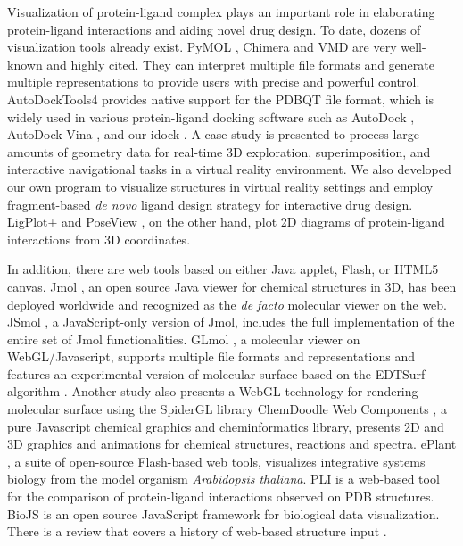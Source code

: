 \documentclass{bioinfo}
\begin{document}
Visualization of protein-ligand complex plays an important role in elaborating protein-ligand interactions and aiding novel drug design. To date, dozens of visualization tools already exist. PyMOL \citep{1221}, Chimera \citep{1219} and VMD \citep{1220} are very well-known and highly cited. They can interpret multiple file formats and generate multiple representations to provide users with precise and powerful control. AutoDockTools4 \citep{596} provides native support for the PDBQT file format, which is widely used in various protein-ligand docking software such as AutoDock \citep{596}, AutoDock Vina \citep{595}, and our idock \citep{1153}. A case study \citep{1321} is presented to process large amounts of geometry data for real-time 3D exploration, superimposition, and interactive navigational tasks in a virtual reality environment. We also developed our own program \citep{1265} to visualize structures in virtual reality settings and employ fragment-based \textit{de novo} ligand design strategy for interactive drug design. LigPlot+ \citep{951} and PoseView \citep{748}, on the other hand, plot 2D diagrams of protein-ligand interactions from 3D coordinates.

In addition, there are web tools based on either Java applet, Flash, or HTML5 canvas. Jmol \citep{1263}, an open source Java viewer for chemical structures in 3D, has been deployed worldwide and recognized as the \textit{de facto} molecular viewer on the web. JSmol \citep{1314}, a JavaScript-only version of Jmol, includes the full implementation of the entire set of Jmol functionalities. GLmol \citep{1319}, a molecular viewer on WebGL/Javascript, supports multiple file formats and representations and features an experimental version of molecular surface based on the EDTSurf algorithm \citep{1297}. Another study \citep{1262} also presents a WebGL technology for rendering molecular surface using the SpiderGL library \citep{1320} ChemDoodle Web Components \citep{1264}, a pure Javascript chemical graphics and cheminformatics library, presents 2D and 3D graphics and animations for chemical structures, reactions and spectra. ePlant \citep{1242}, a suite of open-source Flash-based web tools, visualizes integrative systems biology from the model organism \textit{Arabidopsis thaliana}. PLI \citep{1288} is a web-based tool for the comparison of protein-ligand interactions observed on PDB structures. BioJS \citep{1308} is an open source JavaScript framework for biological data visualization. There is a review that covers a history of web-based structure input \citep{1243}.
\end{document}
